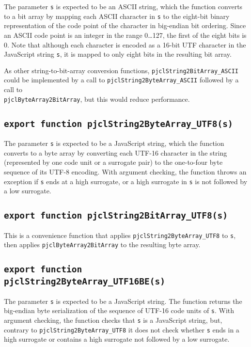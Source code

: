 \documentclass[12pt]{article}
\begin{document}
The parameter {\tt s} is expected to be an ASCII string, which the
function converts to a bit array by mapping each ASCII character in
{\tt s} to the eight-bit binary representation of the code point of the character
in big-endian bit ordering.  Since an
ASCII code point is an integer in the range 0\ldots 127, the first of the eight
bits is 0.  Note that although each character is encoded as a 16-bit
UTF character in the JavaScript string {\tt s}, it is mapped to only eight
bits in the resulting bit array.

As other string-to-bit-array conversion functions, {\tt pjclString2BitArray\_ASCII}
could be implemented by a call to {\tt pjclString2ByteArray\_ASCII}
followed by a call to\\
{\tt pjclByteArray2BitArray}, but this would reduce performance.

\subsection{\tt export function pjclString2ByteArray\_UTF8(s)}

The parameter {\tt s} is expected to be a JavaScript string, which the
function converts to a byte array by 
converting each UTF-16 character in the string (represented by one code unit
or a surrogate pair) to the one-to-four byte sequence of its UTF-8 encoding.
With argument checking, the function throws an exception if {\tt s} ends at 
a high surrogate, or a high surrogate in {\tt s} is not followed by a low surrogate.

\subsection{\tt export function pjclString2BitArray\_UTF8(s)}

This is a convenience function that applies {\tt pjclString2ByteArray\_UTF8} to {\tt s},
then applies {\tt pjclByteArray2BitArray} to the resulting byte array.

\subsection{\tt export function pjclString2ByteArray\_UTF16BE(s)}

The parameter {\tt s} is expected to be a JavaScript string.  
The function returns the big-endian byte serialization of the sequence of
UTF-16 code units of {\tt s}.  With argument checking, the function
checks that {\tt s} is a JavaScript string, but, contrary to
{\tt pjclString2ByteArray\_UTF8} it does not check whether {\tt s} ends
in a high surrogate or contains a high surrogate not followed by a low
surrogate.
\end{document}
